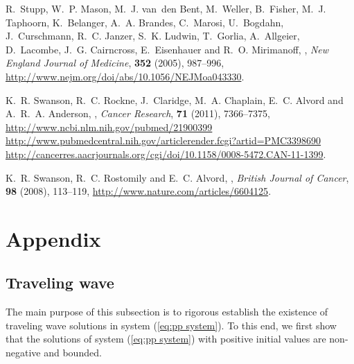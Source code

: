 \documentclass{aims}
\numberwithin{equation}{section}
\begin{document}
\begin{thebibliography}{10}
\newblock R.~Stupp, W.~P. Mason, M.~J. van~den Bent, M.~Weller, B.~Fisher,
  M.~J. Taphoorn, K.~Belanger, A.~A. Brandes, C.~Marosi, U.~Bogdahn,
  J.~Curschmann, R.~C. Janzer, S.~K. Ludwin, T.~Gorlia, A.~Allgeier,
  D.~Lacombe, J.~G. Cairncross, E.~Eisenhauer and R.~O. Mirimanoff,
,
\newblock \emph{New England Journal of Medicine}, \textbf{352} (2005),
  987--996,
\newblock \urlprefix\url{http://www.nejm.org/doi/abs/10.1056/NEJMoa043330}.

\newblock K.~R. Swanson, R.~C. Rockne, J.~Claridge, M.~A. Chaplain, E.~C.
  Alvord and A.~R.~A. Anderson,
,
\newblock \emph{Cancer Research}, \textbf{71} (2011), 7366--7375,
\newblock \urlprefix\url{http://www.ncbi.nlm.nih.gov/pubmed/21900399
  http://www.pubmedcentral.nih.gov/articlerender.fcgi?artid=PMC3398690
  http://cancerres.aacrjournals.org/cgi/doi/10.1158/0008-5472.CAN-11-1399}.

\newblock K.~R. Swanson, R.~C. Rostomily and E.~C. Alvord,
,
\newblock \emph{British Journal of Cancer}, \textbf{98} (2008), 113--119,
\newblock \urlprefix\url{http://www.nature.com/articles/6604125}.

\end{thebibliography}



\section*{Appendix}
\subsection*{Traveling wave}
The main purpose of this subsection is to rigorous establish the existence of  traveling wave solutions in system (\ref{eq:pp system}). To this end, we first show that the solutions of system (\ref{eq:pp system}) 
with positive initial values are non-negative and bounded. \\
 
\end{document}
